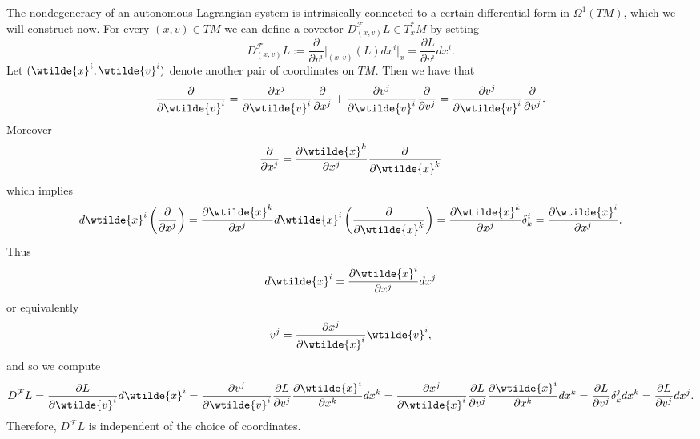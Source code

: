The nondegeneracy of an autonomous Lagrangian system is intrinsically connected to a certain differential form in $\Omega^1(TM)$, which we will construct now. For every $(x,v) \in TM$ we can define a covector $D^\mathcal{F}_{(x,v)} L \in T^*_xM$ by setting
\begin{equation}
	D^\mathcal{F}_{(x,v)}L := \frac{\partial}{\partial v^i}\bigg\vert_{(x,v)}(L) dx^i\vert_x = \frac{\partial L}{\partial v^i}dx^i.
\end{equation}
Let $(\wtilde{x}^i,\wtilde{v}^i)$ denote another pair of coordinates on $TM$. Then we have that 
\begin{equation*}
	\frac{\partial}{\partial \wtilde{v}^i} = \frac{\partial x^j}{\partial \wtilde{v}^i}\frac{\partial}{\partial x^j} + \frac{\partial v^j}{\partial \wtilde{v}^i}\frac{\partial}{\partial v^j} = \frac{\partial v^j}{\partial \wtilde{v}^i}\frac{\partial}{\partial v^j}.
\end{equation*}
Moreover
\begin{equation*}
	\frac{\partial}{\partial x^j} = \frac{\partial \wtilde{x}^k}{\partial x^j} \frac{\partial}{\partial \wtilde{x}^k}
\end{equation*}
\noindent which implies
\begin{equation*}
	d\wtilde{x}^i \del[3]{\frac{\partial}{\partial x^j}} = \frac{\partial \wtilde{x}^k}{\partial x^j} d\wtilde{x}^i\del[3]{\frac{\partial}{\partial \wtilde{x}^k}} = \frac{\partial \wtilde{x}^k}{\partial x^j}\delta^i_k = \frac{\partial \wtilde{x}^i}{\partial x^j}.
\end{equation*}
Thus
\begin{equation*}
	d\wtilde{x}^i = \frac{\partial \wtilde{x}^i}{\partial x^j} dx^j
\end{equation*}
\noindent or equivalently 
\begin{equation*}
	v^j = \frac{\partial x^j}{\partial \wtilde{x}^i}\wtilde{v}^i,
\end{equation*}
\noindent and so we compute
\begin{equation*}
	D^\mathcal{F}L = \frac{\partial L}{\partial \wtilde{v}^i}d\wtilde{x}^i = \frac{\partial v^j}{\partial \wtilde{v}^i}\frac{\partial L}{\partial v^j}\frac{\partial \wtilde{x}^i}{\partial x^k} dx^k = \frac{\partial x^j}{\partial \wtilde{x}^i}\frac{\partial L}{\partial v^j}\frac{\partial \wtilde{x}^i}{\partial x^k} dx^k = \frac{\partial L}{\partial v^j}\delta^j_k dx^k = \frac{\partial L}{\partial v^j}dx^j.
\end{equation*}
Therefore, $D^\mathcal{F}L$ is independent of the choice of coordinates.

